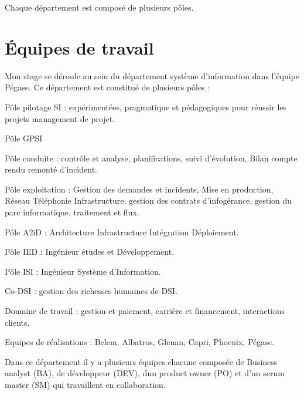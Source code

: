 	Chaque département est composé de plusieurs pôles.

    

    \section{Équipes de travail}
    Mon stage se déroule au sein du département système d’information dans l’équipe Pégase. Ce département est constitué de plusieurs pôles :
    \medskip

	Pôle pilotage SI : expérimentées, pragmatique et pédagogiques pour réussir les projets management de projet.
	\medskip

    Pôle GPSI
	\medskip

    Pôle conduite : contrôle et analyse, planifications, suivi d’évolution, Bilan compte rendu remonté d’incident.
	\medskip

    Pôle exploitation : Gestion des demandes et incidents, Mise en production, Réseau Téléphonie Infrastructure, gestion des contrats d’infogérance, gestion du parc informatique, traitement et flux.
	\medskip

    Pôle A2iD : Architecture Infrastructure Intégration Déploiement.
	\medskip

    Pôle IED : Ingénieur études et Développement.
	\medskip

    Pôle ISI : Ingénieur Système d’Information.
	\medskip

    Co-DSI : gestion des richesses humaines de DSI.
    \medskip

    Domaine de travail :  gestion et paiement, carrière et financement, interactions clients.
    \medskip

    Equipes de réalisations : Belem, Albatros, Glenan, Capri, Phoenix, Pégase.
    \medskip

	Dans ce département il y a plusieurs équipes chacune composée de Business analyst (BA), de développeur (DEV), dun product owner (PO) et d'un scrum master (SM) qui travaillent en collaboration.




